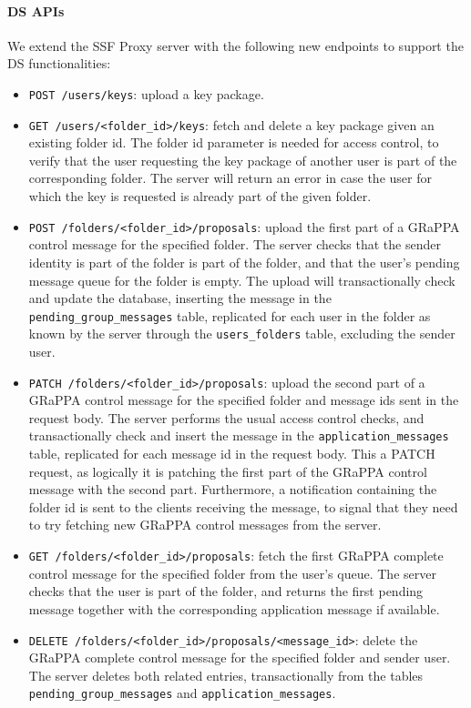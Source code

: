 \paragraph{DS APIs}
We extend the SSF Proxy server with the following new endpoints to support the DS functionalities:
\begin{itemize}
    \item \texttt{POST /users/keys}: upload a key package.
    \item \texttt{GET /users/<folder\_id>/keys}: fetch and delete a key package given an existing folder id. The folder id parameter is needed for access control, to verify that the user requesting the key package of another user is part of the corresponding folder. The server will return an error in case the user for which the key is requested is already part of the given folder.
    \item \texttt{POST /folders/<folder\_id>/proposals}: upload the first part of a GRaPPA control message for the specified folder. The server checks that the sender identity is part of the folder is part of the folder, and that the user's pending message queue for the folder is empty. The upload will transactionally check and update the database, inserting the message in the \texttt{pending\_group\_messages} table, replicated for each user in the folder as known by the server through the \texttt{users\_folders} table, excluding the sender user.
    \item \texttt{PATCH /folders/<folder\_id>/proposals}: upload the second part of a GRaPPA control message for the specified folder and message ids sent in the request body. The server performs the usual access control checks, and transactionally check and insert the message in the \texttt{application\_messages} table, replicated for each message id in the request body. This a PATCH request, as logically it is patching the first part of the GRaPPA control message with the second part. Furthermore, a notification containing the folder id is sent to the clients receiving the message, to signal that they need to try fetching new GRaPPA control messages from the server. 
    \item \texttt{GET /folders/<folder\_id>/proposals}: fetch the first GRaPPA complete control message for the specified folder from the user's queue. The server checks that the user is part of the folder, and returns the first pending message together with the corresponding application message if available.
    \item \texttt{DELETE /folders/<folder\_id>/proposals/<message\_id>}: delete the GRaPPA complete control message for the specified folder and sender user. The server deletes both related entries, transactionally from the tables \texttt{pending\_group\_messages} and \texttt{application\_messages}.

\end{itemize}
